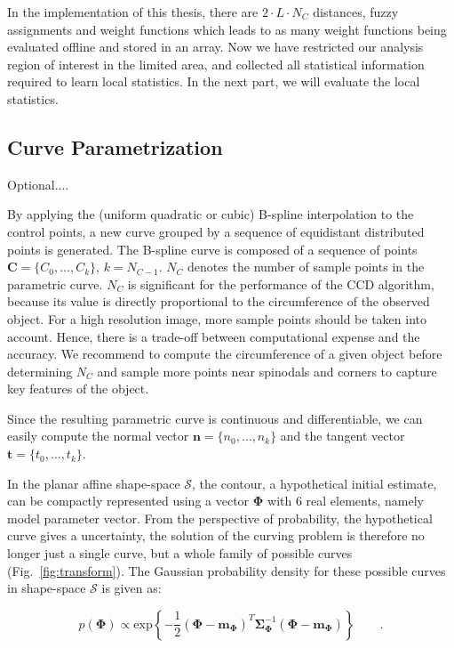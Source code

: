 \documentclass[conference]{IEEEtran}
\begin{document}
In the implementation of this thesis,
there are $2 \cdot L \cdot N_C$ distances, fuzzy assignments
and weight functions which leads to as many weight functions being evaluated offline and stored in an array. Now we have restricted our analysis region of interest in the
limited area, and collected all statistical information required to learn
local statistics. In the next part, we will evaluate the local
statistics.

\subsection{Curve Parametrization}
Optional....

By applying the (uniform quadratic or cubic) B-spline interpolation to the control points, a new curve
grouped by a sequence of equidistant distributed points is generated. 
The B-spline curve %
is composed of a sequence of points $\mathbf{C} = \{C_0, \ldots,
C_{k}\}$, $k = N_{C-1}$. $N_C$ denotes the number of sample points in the
parametric curve. $N_C$ is significant for the
performance of the CCD algorithm, because its value is directly
proportional to the circumference of the observed object. For a high
resolution image, more sample points should be taken into account.
Hence, there is a trade-off between computational expense and the
accuracy. We recommend to compute the circumference of a given object before
determining $N_C$ and sample more points near spinodals and corners to
capture key features of the object.

Since the resulting parametric curve is continuous and
differentiable, we can easily compute the normal vector $\mathbf{n} = \{n_0, \ldots,
n_{k}\}$ and the tangent vector $\mathbf{t} = \{t_0, \ldots, t_{k}\}$.

In the planar affine shape-space $\mathcal{S}$, the contour, a
hypothetical initial estimate, can be compactly represented using a
vector $\mathbf{\Phi}$ with 6 real elements, namely model
parameter vector. From the perspective of probability, the hypothetical
curve gives a uncertainty, the solution of the curving problem is
therefore no longer just a single curve, but a whole family of
possible curves (Fig.~\ref{fig:transform}). The Gaussian probability density for these possible
curves in shape-space $\mathcal{S}$ is given as:

\begin{equation}
  \label{eq:prior}
   p(\mathbf{\Phi}) \propto
\mathrm{exp} \left\{ -\frac{1}{2} (\mathbf{\Phi} -
  \mathbf{m}_{\mathbf{\Phi}})^T \mathbf{\Sigma}_{\mathbf{\Phi}}^{-1} (\mathbf{\Phi} -
  \mathbf{m}_{\mathbf{\Phi}}) \right\}\qquad.
\end{equation}
\end{document}
